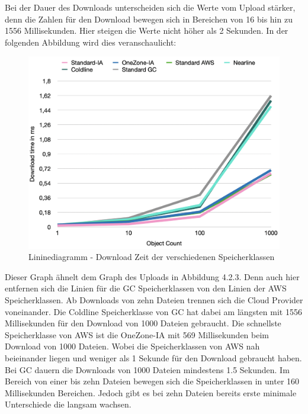 \newpage

Bei der Dauer des Downloads unterscheiden sich die Werte vom Upload stärker, denn die Zahlen für den Download bewegen sich in Bereichen von 16 bis hin zu 1556 Millisekunden. Hier steigen die Werte nicht höher als 2 Sekunden. In der folgenden Abbildung wird dies veranschaulicht:

\begin{figure}[h]
	\centering
	\includegraphics[width=13cm,keepaspectratio]{Pictures/DownloadTime.png}
	\caption{Lininediagramm - Download Zeit der verschiedenen Speicherklassen}
\end{figure}

Dieser Graph ähnelt dem Graph des Uploads in Abbildung 4.2.3. Denn auch hier entfernen sich die Linien für die GC Speicherklassen von den Linien der AWS Speicherklassen. Ab Downloads von zehn Dateien trennen sich die Cloud Provider voneinander. Die Coldline Speicherklasse von GC hat dabei am längsten mit 1556 Millisekunden für den Download von 1000 Dateien gebraucht. Die schnellste Speicherklasse von AWS ist die OneZone-IA mit 569 Millisekunden beim Download von 1000 Dateien. Wobei die Speicherklassen von AWS nah beieinander liegen und weniger als 1 Sekunde für den Download gebraucht haben. Bei GC dauern die Downloads von 1000 Dateien mindestens 1.5 Sekunden. Im Bereich von einer bis zehn Dateien bewegen sich die Speicherklassen in unter 160 Millisekunden Bereichen. Jedoch gibt es bei zehn Dateien bereits erste minimale Unterschiede die langsam wachsen.\\
 